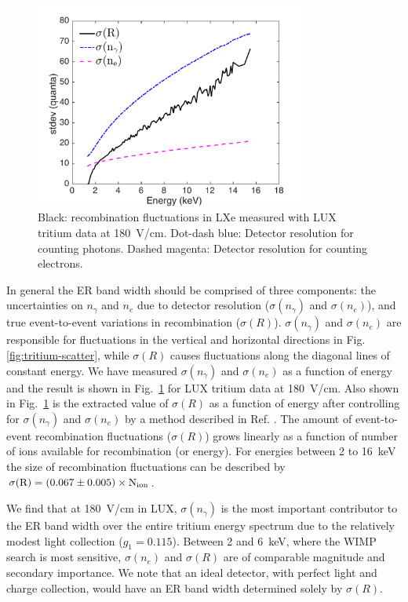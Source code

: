\begin{figure}[t!]
\includegraphics[width=90mm]{fig12.pdf}
\caption{Black: recombination fluctuations in LXe measured with LUX tritium data at 180~V/cm. Dot-dash blue: Detector resolution for counting photons. Dashed magenta: Detector resolution for counting electrons.}
\label{fig:recomb-flucs}
\end{figure}


In general the ER band width should be comprised of three components: the uncertainties on  $n_{\gamma}$ and $n_e$  due to detector resolution ($ \sigma(n_{\gamma})$ and $ \sigma(n_e)$), and true event-to-event variations in recombination ($ \sigma(R)$). $ \sigma(n_{\gamma})$ and $ \sigma(n_e)$ are responsible for fluctuations in the vertical  and horizontal directions in Fig. \ref{fig:tritium-scatter},  while $ \sigma(R)$ causes fluctuations along the diagonal lines of constant energy. We have measured $ \sigma(n_{\gamma})$ and $ \sigma(n_e)$ as a function of energy and the result is shown in Fig.~\ref{fig:recomb-flucs} for LUX tritium data at 180~V/cm\cite{Dobi_Thesis}. Also shown in Fig.~\ref{fig:recomb-flucs} is the extracted value of $ \sigma(R)$ as a function of energy after controlling for $ \sigma(n_{\gamma})$ and $ \sigma(n_e)$ by a method described in Ref. \cite{Dobi_Thesis}. The amount of event-to-event recombination fluctuations ($ \sigma(R)$) grows linearly as a function of number of ions available for recombination (or energy). For energies between 2 to 16~keV the size of recombination fluctuations can be described by $\rm \sigma(R)=(0.067\pm0.005) \times N_{ion}$.

We find that at 180~V/cm in LUX, $ \sigma(n_{\gamma})$ is the most important contributor to the ER band width over the entire tritium energy spectrum due to the relatively modest light collection ($g_1 = 0.115$). Between 2 and 6~keV, where the WIMP search is most sensitive, $ \sigma(n_e)$ and $ \sigma(R)$ are of comparable magnitude and secondary importance. We note that an ideal detector, with perfect light and charge collection, would have an ER band width determined solely by $ \sigma(R)$. 


